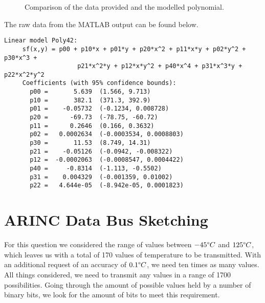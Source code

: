 \documentclass[english,palatino]{ist-report}
\begin{document}
\begin{figure}[ht]
	\centering
	\label{fig:3dplotmain}
	\caption{Comparison of the data provided and the modelled polynomial.}
\end{figure}

The raw data from the MATLAB output can be found below.  
\begin{verbatim}
Linear model Poly42:
     sf(x,y) = p00 + p10*x + p01*y + p20*x^2 + p11*x*y + p02*y^2 + p30*x^3 + 
                    p21*x^2*y + p12*x*y^2 + p40*x^4 + p31*x^3*y + p22*x^2*y^2
     Coefficients (with 95% confidence bounds):
       p00 =       5.639  (1.566, 9.713)
       p10 =       382.1  (371.3, 392.9)
       p01 =    -0.05732  (-0.1234, 0.008728)
       p20 =      -69.73  (-78.75, -60.72)
       p11 =      0.2646  (0.166, 0.3632)
       p02 =   0.0002634  (-0.0003534, 0.0008803)
       p30 =       11.53  (8.749, 14.31)
       p21 =    -0.05126  (-0.0942, -0.008322)
       p12 =  -0.0002063  (-0.0008547, 0.0004422)
       p40 =     -0.8314  (-1.113, -0.5502)
       p31 =    0.004329  (-0.001359, 0.01002)
       p22 =   4.644e-05  (-8.942e-05, 0.0001823)
\end{verbatim}

\section{ARINC Data Bus Sketching}

For this question we considered the range of values between $\num{-45}\degree C$ and $\num{125}\degree C$, which leaves us with a total of 170 values of temperature to be transmitted. With an additional request of an accuracy of $\num{0.1}\degree C$, we need ten times as many values. All things considered, we need to transmit any values in a range of 1700 possibilities. Going through the amount of possible values held by a number of binary bits, we look for the amount of bits to meet this requirement.
\end{document}
